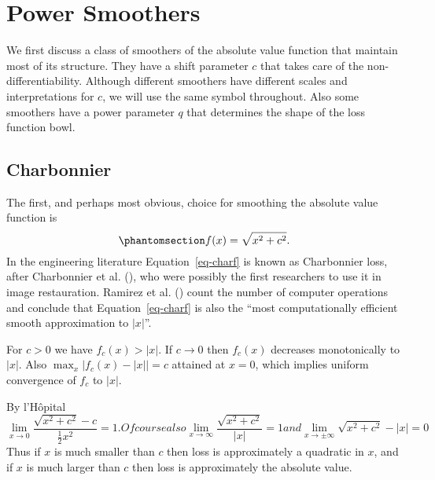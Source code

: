 \documentclass[
  12pt,
  letterpaper,
  DIV=11,
  numbers=noendperiod]{scrartcl}
\newcommand{\sectionbreak}{\pagebreak}
\theoremstyle{definition}
\theoremstyle{plain}
\theoremstyle{plain}
\theoremstyle{plain}
\theoremstyle{definition}
\theoremstyle{remark}
\begin{document}
\sectionbreak

\section{Power Smoothers}\label{power-smoothers}

We first discuss a class of smoothers of the absolute value function
that maintain most of its structure. They have a shift parameter \(c\)
that takes care of the non-differentiability. Although different
smoothers have different scales and interpretations for \(c\), we will
use the same symbol throughout. Also some smoothers have a power
parameter \(q\) that determines the shape of the loss function bowl.

\subsection{Charbonnier}\label{sec-charb}

The first, and perhaps most obvious, choice for smoothing the absolute
value function is \begin{equation}\phantomsection\label{eq-charf}{
f(x)=\sqrt{x^2 + c^2}.
}\end{equation} In the engineering literature Equation~\ref{eq-charf} is
known as Charbonnier loss, after Charbonnier et al.
(), who
were possibly the first researchers to use it in image restauration.
Ramirez et al.
() count the
number of computer operations and conclude that Equation~\ref{eq-charf}
is also the ``most computationally efficient smooth approximation to
\(|x|\)''.

For \(c>0\) we have \(f_c(x)>|x|\). If \(c\rightarrow 0\) then
\(f_c(x)\) decreases monotonically to \(|x|\). Also
\(\max_x|f_c(x)-|x||=c\) attained at \(x=0\), which implies uniform
convergence of \(f_c\) to \(|x|\).

By l'Hôpital \begin{subequations}
\begin{equation}
\lim_{x\rightarrow 0}\frac{\sqrt{x^2+c^2}-c}{\frac12x^2}=1.
\end{equation}
Of course also
\begin{equation}
\lim_{x\rightarrow\infty}\frac{\sqrt{x^2+c^2}}{|x|}=1
\end{equation}
and
\begin{equation}
\lim_{x\rightarrow\pm\infty}\sqrt{x^2+c^2}-|x|=0
\end{equation}
\end{subequations} Thus if \(x\) is much smaller than \(c\) then loss is
approximately a quadratic in \(x\), and if \(x\) is much larger than
\(c\) then loss is approximately the absolute value.
\end{document}
